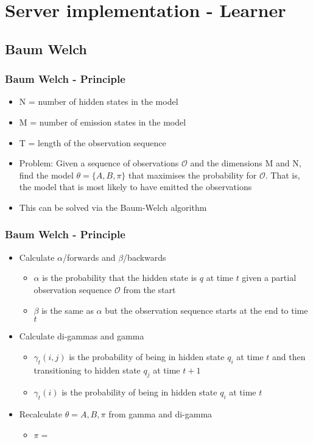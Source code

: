 \section{Server implementation - Learner}
\subsection{Baum Welch}
\begin{frame}
	\frametitle{Baum Welch - Principle}
	\begin{itemize}
		\item N = number of hidden states in the model
		\item M = number of emission states in the model
		\item T = length of the observation sequence
		\item Problem: Given a sequence of observations $\mathcal{O}$ and the dimensions M and N, find the model $\theta = \{A, B, \pi\}$ that maximises the probability for $\mathcal{O}$. That is, the model that is most likely to have emitted the observations
		\item This can be solved via the Baum-Welch algorithm
	\end{itemize}
\end{frame}

\begin{frame}
	\frametitle{Baum Welch - Principle}
	\begin{itemize}
		\item Calculate $\alpha$/forwards and $\beta$/backwards
		\begin{itemize}
			\item $\alpha$ is the probability that the hidden state is $q$ at time $t$ given a partial observation sequence $\mathcal{O}$ from the start
			\item $\beta$ is the same as $\alpha$ but the observation sequence starts at the end to time $t$
		\end{itemize}
		\item Calculate di-gammas and gamma
		\begin{itemize}
			\item $\gamma_t(i,j)$ is the probability of being in hidden state $q_i$ at time $t$ and then transitioning to hidden state $q_j$ at time $t+1$
			\item $\gamma_t(i)$ is the probability of being in hidden state $q_i$ at time $t$
		\end{itemize}
		\item Recalculate $\theta = {A,B,\pi}$ from gamma and di-gamma
		\begin{itemize}
			\item $\pi = $
		\end{itemize}
	\end{itemize}
\end{frame}

